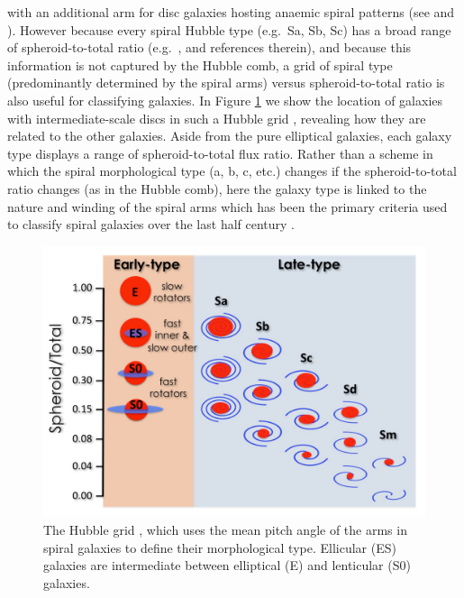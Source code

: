 \documentclass[useAMS,usenatbib,article]{mn2e}
\begin{document}
with an additional arm for disc galaxies hosting anaemic spiral patterns (see \citealt{cappellari2011kmdr-MNRAS} and \citealt{kormendybender2012}).  
However because every spiral Hubble type (e.g.~Sa, Sb, Sc) has a broad range of spheroid-to-total ratio 
(e.g.~\citealt{grahamworley2008}, and references therein), 
and because this information is not captured by the Hubble comb, 
a grid of spiral type (predominantly determined by the spiral arms) versus spheroid-to-total ratio is also useful for classifying galaxies.   
In Figure \ref{fig:grid} we show the location of galaxies with intermediate-scale discs in such a Hubble grid \citep{graham2014review}, 
revealing how they are related to the other galaxies.  
Aside from the pure elliptical galaxies, each galaxy type displays a range of spheroid-to-total flux ratio.  
Rather than a scheme in which the spiral morphological type (a, b, c, etc.) changes if the spheroid-to-total ratio changes (as in the Hubble comb), 
here the galaxy type is linked to the nature and winding of the spiral arms which has been the primary criteria used 
to classify spiral galaxies over the last half century \citep{sandage1961}.

\begin{figure}[h]
\begin{center}
\includegraphics[width=\columnwidth]{images/Hubble-grid-2/Hubblegrid.pdf}
\caption{The Hubble grid \citep{graham2014review}, 
which uses the mean pitch angle of the arms in spiral galaxies to define their morphological type. 
Ellicular (ES) galaxies are intermediate between elliptical (E) and lenticular (S0) galaxies. }
\label{fig:grid}
\end{center}
\end{figure}
\end{document}

